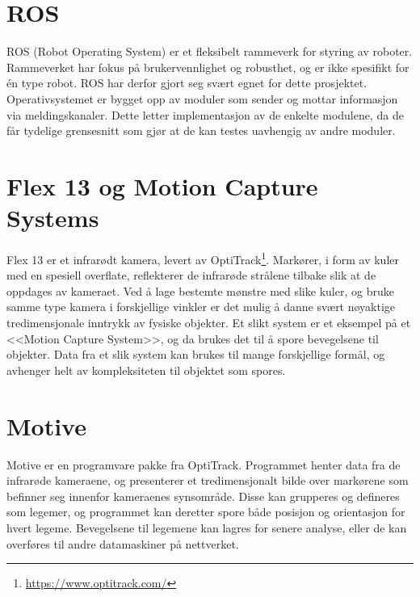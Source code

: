 \section{ROS}

ROS (Robot Operating System) er et fleksibelt rammeverk for styring av roboter. Rammeverket har fokus på brukervennlighet og robusthet, og er ikke spesifikt for én type robot. ROS har derfor gjort seg svært egnet for dette prosjektet. Operativsystemet er bygget opp av moduler som sender og mottar informasjon via meldingskanaler. Dette letter implementasjon av de enkelte modulene, da de får tydelige grensesnitt som gjør at de kan testes uavhengig av andre moduler.

\section{Flex 13 og Motion Capture Systems}

Flex 13 er et infrarødt kamera, levert av OptiTrack\footnote{\url{https://www.optitrack.com/}}. Markører, i form av kuler med en spesiell overflate, reflekterer de infrarøde strålene tilbake slik at de oppdages av kameraet. Ved å lage bestemte mønstre med slike kuler, og bruke samme type kamera i forskjellige vinkler er det mulig å danne svært nøyaktige tredimensjonale inntrykk av fysiske objekter. Et slikt system er et eksempel på et <<Motion Capture System>>, og da brukes det til å spore bevegelsene til objekter. Data fra et slik system kan brukes til mange forskjellige formål, og avhenger helt av kompleksiteten til objektet som spores. 




\section{Motive}

Motive er en programvare pakke fra OptiTrack. Programmet henter data fra de infrarøde kameraene, og presenterer et tredimensjonalt bilde over markørene som befinner seg innenfor kameraenes synsområde.
Disse kan grupperes og defineres som legemer, og programmet kan deretter spore både posisjon og orientasjon for hvert legeme. Bevegelsene til legemene kan lagres for senere analyse, eller de kan overføres 
til andre datamaskiner på nettverket.

